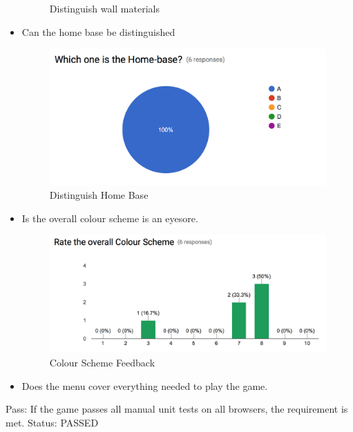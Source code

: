 \documentclass{article}
\begin{document}
\begin{itemize}
\begin{figure}[H]
	\caption{Distinguish wall materials}
\end{figure}
\item Can the home base be distinguished
\begin{figure}[H]
	\centering
	\includegraphics[width=\textwidth]{./Figures/3.png}
	\caption{Distinguish Home Base}
\end{figure}
\item Is the overall colour scheme is an eyesore.
\begin{figure}[H]
	\centering
	\includegraphics[width=\textwidth]{./Figures/7.png}
	\caption{Colour Scheme Feedback}
\end{figure}
\item Does the menu cover everything needed to play the game.
\end{itemize}
Pass:  If the game passes all manual unit tests on all browsers, the requirement
 is met.\newline
 \newline
Status: PASSED
\end{document}
